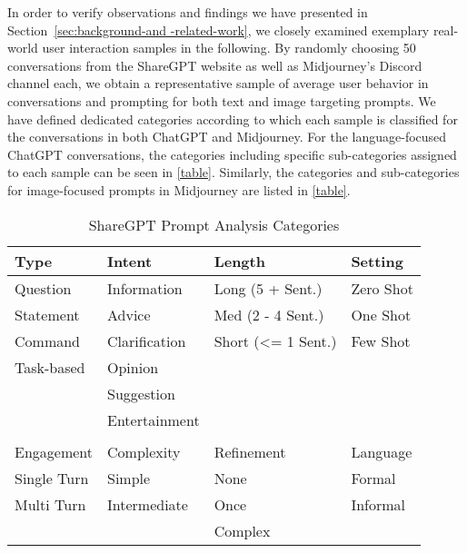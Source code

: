 In order to verify observations and findings we have presented in Section~\ref{sec:background-and
-related-work},
we closely examined exemplary real-world user interaction samples in the following.
By randomly choosing 50 conversations from the ShareGPT website as well as Midjourney's Discord
channel each, we obtain a representative sample of average user behavior in conversations and
prompting for both text and image targeting prompts.
We have defined dedicated categories according to which each sample is classified for the
conversations in both ChatGPT and Midjourney.
For the language-focused ChatGPT conversations, the categories including specific sub-categories assigned to each sample can be seen in \ref{table}.
Similarly, the categories and sub-categories for image-focused prompts in Midjourney are listed
in \ref{table}.

\begin{table}[]
    \centering
    \caption{ShareGPT Prompt Analysis Categories}
    \begin{tabular}{@{}llll@{}}
        \toprule
        Type & Intent & Length & Setting \\ \midrule
        Question & Information & Long (5 + Sent.) & Zero Shot \\
        Statement & Advice & Med (2 - 4 Sent.) & One Shot \\
        Command & Clarification & Short (<= 1 Sent.) & Few Shot \\
        Task-based & Opinion &  &  \\
        & Suggestion &  &  \\
        & Entertainment &  &  \\
        & & & \\
        \toprule
        Engagement & Complexity & Refinement & Language \\ \midrule
        Single Turn & Simple & None & Formal \\
        Multi Turn & Intermediate & Once & Informal \\
        &  & Complex &  \\ \bottomrule
    \end{tabular}
    \label{tab:table}
\end{table}

